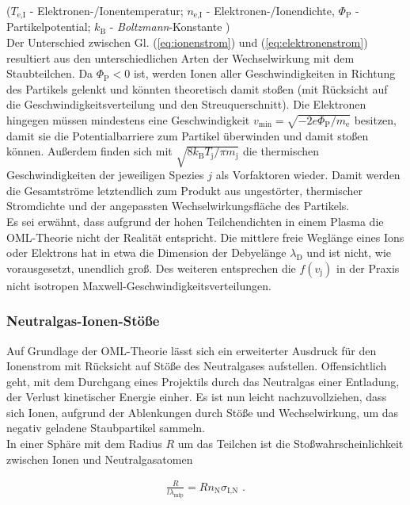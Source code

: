 \documentclass[numbers=noenddot,a4paper]{scrartcl}
\newcommand{\ix}[1]{_\text{#1}}
\newcommand{\tilt}[1]{\textit{#1}}
\begin{document}
			($T\ix{e,I}$ - Elektronen-/Ionentemperatur; $n\ix{e,I}$ - Elektronen-/Ionendichte, $\Phi\ix{P}$ - Partikelpotential; $k\ix{B}$ - \tilt{Boltzmann}-Konstante )\\
			Der Unterschied zwischen Gl. (\ref{eq:ionenstrom}) und (\ref{eq:elektronenstrom}) resultiert aus den unterschiedlichen Arten der Wechselwirkung mit dem Staubteilchen. Da $\Phi\ix{P}<0$ ist, werden Ionen aller Geschwindigkeiten in Richtung des Partikels gelenkt und könnten theoretisch damit stoßen (mit Rücksicht auf die Geschwindigkeitsverteilung und den Streuquerschnitt). Die Elektronen hingegen müssen mindestens eine Geschwindigkeit $v\ix{min}=\sqrt{-2e\Phi\ix{P}/m\ix{e}}$ besitzen, damit sie die Potentialbarriere zum Partikel überwinden und damit stoßen können. Au{\ss}erdem finden sich mit $\sqrt{8k\ix{B}T\ix{j}/\pi m\ix{j}}$ die thermischen Geschwindigkeiten der jeweiligen Spezies $j$ als Vorfaktoren wieder. Damit werden die Gesamtstr\"ome letztendlich zum Produkt aus ungest\"orter, thermischer Stromdichte und der angepassten Wechselwirkungsfl\"ache des Partikels. \\
			Es sei erwähnt, dass aufgrund der hohen Teilchendichten in einem Plasma die OML-Theorie nicht der Realität entspricht. Die mittlere freie Weglänge eines Ions oder Elektrons hat in etwa die Dimension der Debyelänge $\lambda\ix{D}$ und ist nicht, wie vorausgesetzt, unendlich groß. Des weiteren entsprechen die $f\left(v\ix{j}\right)$ in der Praxis nicht isotropen Maxwell-Geschwindigkeitsverteilungen.

			\subsubsection{Neutralgas-Ionen-Stöße}

			Auf Grundlage der OML-Theorie lässt sich ein erweiterter Ausdruck für den Ionenstrom mit Rücksicht auf Stöße des Neutralgases aufstellen. Offensichtlich geht, mit dem Durchgang eines Projektils durch das Neutralgas einer Entladung, der Verlust kinetischer Energie einher. Es ist nun leicht nachzuvollziehen, dass sich Ionen, aufgrund der Ablenkungen durch Stöße und Wechselwirkung, um das negativ geladene Staubpartikel sammeln.
			\\In einer Sphäre mit dem Radius $R$ um das Teilchen ist die Stoßwahrscheinlichkeit zwischen Ionen und Neutralgasatomen

				\begin{align}
					\frac{R}{l\lambda\ix{mfp}}=Rn\ix{N}\sigma\ix{I,N} \,\, . \label{eq:wahrschein}
				\end{align}
\end{document}
